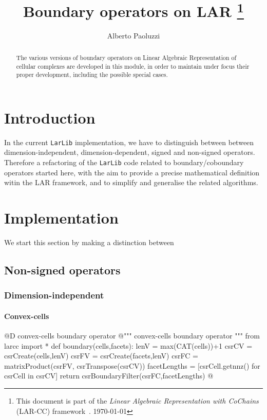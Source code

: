 \documentclass[11pt,oneside]{article}	%
\title{Boundary operators on LAR
\footnote{This document is part of the \emph{Linear Algebraic Representation with CoChains} (LAR-CC) framework~\cite{cclar-proj:2013:00}. \today}
}
\author{Alberto Paoluzzi}
\begin{document}
\maketitle
\nonstopmode

\begin{abstract}
The various versions of boundary operators on Linear Algebraic Representation of cellular complexes are  developed in this module, in order to maintain under focus their proper development, including the possible special cases.
\end{abstract}

\tableofcontents
\newpage

\section{Introduction}

In the current \texttt{LarLib} implementation, we have to distinguish between between dimension-independent, dimension-dependent, signed and non-signed operators.
Therefore a refactoring of the \texttt{LarLib} code related to boundary/coboundary operators started here, with the aim to provide a precise mathematical definition witin the LAR framework, and to simplify and generalise the related algorithms.


\section{Implementation}

We start this section by making a distinction between 


\subsection{Non-signed operators}


\subsubsection{Dimension-independent}


\paragraph{Convex-cells}

@D convex-cells boundary operator
@{""" convex-cells boundary operator """
from larcc import *
def boundary(cells,facets):
    lenV = max(CAT(cells))+1
    csrCV = csrCreate(cells,lenV)
    csrFV = csrCreate(facets,lenV)
    csrFC = matrixProduct(csrFV, csrTranspose(csrCV))
    facetLengths = [csrCell.getnnz() for csrCell in csrCV]
    return csrBoundaryFilter(csrFC,facetLengths)
@}
\end{document}
